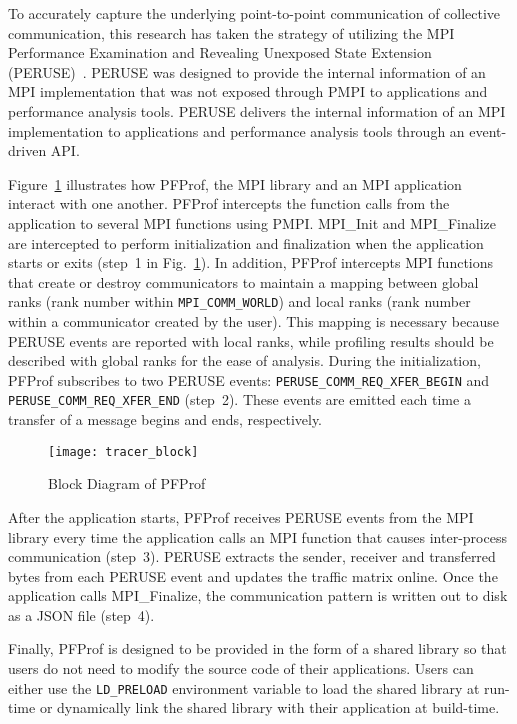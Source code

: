 To accurately capture the underlying point-to-point communication of
collective communication, this research has taken the strategy of utilizing
the MPI Performance Examination and Revealing Unexposed State Extension
(PERUSE)~\autocite{Jones2006}. PERUSE was designed to provide the internal
information of an MPI implementation that was not exposed through PMPI to
applications and performance analysis tools. PERUSE delivers the internal
information of an MPI implementation to applications and performance analysis
tools through an event-driven API\@.

Figure~\ref{fig:profiler-block} illustrates how PFProf, the MPI library and an
MPI application interact with one another. PFProf intercepts the function
calls from the application to several MPI functions using PMPI\@. MPI\_Init
and MPI\_Finalize are intercepted to perform initialization and finalization
when the application starts or exits (step~1 in
Fig.~\ref{fig:profiler-block}). In addition, PFProf intercepts MPI functions
that create or destroy communicators to maintain a mapping between global
ranks (rank number within \lstinline!MPI_COMM_WORLD!) and local ranks (rank
number within a communicator created by the user). This mapping is necessary
because PERUSE events are reported with local ranks, while profiling results
should be described with global ranks for the ease of analysis. During the
initialization, PFProf subscribes to two PERUSE events:
\lstinline!PERUSE_COMM_REQ_XFER_BEGIN! and
\lstinline!PERUSE_COMM_REQ_XFER_END! (step~2). These events are emitted each
time a transfer of a message begins and ends, respectively.

\begin{figure}
    \centering
    \texttt{[image: tracer\_block]}
    \caption{Block Diagram of PFProf}%
    \label{fig:profiler-block}
\end{figure}

After the application starts, PFProf receives PERUSE events from the MPI
library every time the application calls an MPI function that causes
inter-process communication (step~3). PERUSE extracts the sender, receiver and
transferred bytes from each PERUSE event and updates the traffic matrix
online. Once the application calls MPI\_Finalize, the communication pattern is
written out to disk as a JSON file (step~4).

Finally, PFProf is designed to be provided in the form of a shared library so
that users do not need to modify the source code of their applications. Users
can either use the \lstinline!LD_PRELOAD! environment variable to load the
shared library at run-time or dynamically link the shared library with their
application at build-time.

